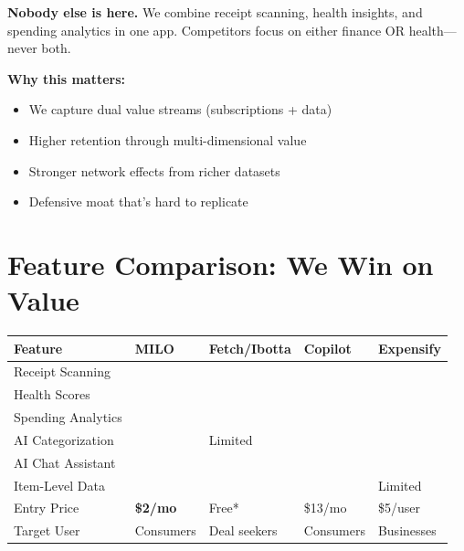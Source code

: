 \documentclass[11pt,a4paper]{report}
\newcommand{\cmark}{\textcolor{successgreen}{\ding{51}}}
\newcommand{\xmark}{\textcolor{dangerred}{\ding{55}}}
\begin{document}
\textbf{Nobody else is here.} We combine receipt scanning, health insights, and spending analytics in one app. Competitors focus on either finance OR health---never both.

\textbf{Why this matters:}
\begin{itemize}[leftmargin=2em, itemsep=3pt]
    \item We capture dual value streams (subscriptions + data)
    \item Higher retention through multi-dimensional value
    \item Stronger network effects from richer datasets
    \item Defensive moat that's hard to replicate
\end{itemize}

\section{Feature Comparison: We Win on Value}

\begin{center}
\renewcommand{\arraystretch}{1.4}
\begin{tabular}{>{\raggedright\arraybackslash}p{3.5cm} >{\centering\arraybackslash}p{2cm} >{\centering\arraybackslash}p{2cm} >{\centering\arraybackslash}p{2cm} >{\centering\arraybackslash}p{2cm}}
\toprule
\rowcolor{miloprimary!15}
\textbf{Feature} & \textbf{MILO} & \textbf{Fetch/Ibotta} & \textbf{Copilot} & \textbf{Expensify} \\
\midrule
Receipt Scanning & \cmark & \cmark & \xmark & \cmark \\
\rowcolor{lightbg}
Health Scores & \cmark & \xmark & \xmark & \xmark \\
Spending Analytics & \cmark & \xmark & \cmark & \cmark \\
\rowcolor{lightbg}
AI Categorization & \cmark & Limited & \cmark & \cmark \\
AI Chat Assistant & \cmark & \xmark & \cmark & \xmark \\
\rowcolor{lightbg}
Item-Level Data & \cmark & \xmark & \xmark & Limited \\
Entry Price & \textcolor{successgreen}{\textbf{\$2/mo}} & Free* & \$13/mo & \$5/user \\
\rowcolor{lightbg}
Target User & Consumers & Deal seekers & Consumers & Businesses \\
\bottomrule
\end{tabular}
\end{center}
\end{document}
